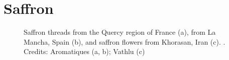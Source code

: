 \section{Saffron}
\label{sec:saffron}



\begin{figure}[!ht]
	\vspace{-4ex}
	\centering
	\hfill
	\hfill
	\caption[Saffron threads and flowers]{Saffron threads from the Quercy region of France (a), from La Mancha, Spain (b), and saffron flowers from Khorasan, Iran (c). . Credits: Aromatiques (a, b); Vathlu (c)\protect\footnotemark}
	\label{fig:saffron_imgs}
\end{figure}


